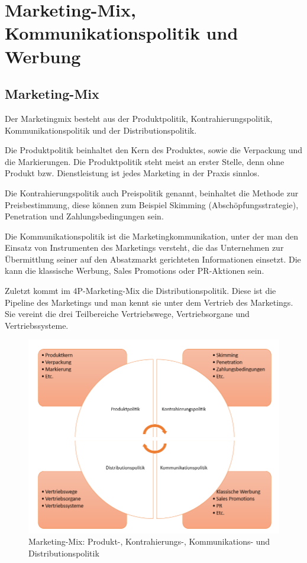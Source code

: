 \chapter{Marketing-Mix, Kommunikationspolitik und Werbung}
\section{Marketing-Mix}
Der Marketingmix besteht aus der Produktpolitik, Kontrahierungspolitik, Kommunikationspolitik und der Distributionspolitik.

Die Produktpolitik beinhaltet den Kern des Produktes, sowie die Verpackung und die Markierungen. Die Produktpolitik steht meist an erster Stelle, denn ohne Produkt bzw. Dienstleistung  ist  jedes  Marketing  in  der  Praxis  sinnlos. 

Die Kontrahierungspolitik auch Preispolitik genannt, beinhaltet die Methode zur Preisbestimmung, diese können zum Beispiel Skimming (Abschöpfungsstrategie), Penetration und Zahlungsbedingungen sein.

Die Kommunikationspolitik ist die Marketingkommunikation, unter der man den Einsatz von Instrumenten des Marketings versteht, die das Unternehmen zur Übermittlung seiner auf den Absatzmarkt gerichteten Informationen einsetzt. Die kann die klassische Werbung, Sales Promotions oder PR-Aktionen sein.

Zuletzt kommt im 4P-Marketing-Mix die Distributionspolitik. Diese ist die Pipeline des Marketings und man kennt sie  unter dem Vertrieb des Marketings. Sie vereint die drei Teilbereiche Vertriebswege, Vertriebsorgane und Vertriebssysteme.
\begin{figure}[H]
	\centering
	\includegraphics[width=1.0\linewidth]{img/MarketingMix}
	\caption[Marketing-Mix]{Marketing-Mix: Produkt-, Kontrahierungs-, Kommunikations- und Distributionspolitik}
	\label{fig:marketingmix}
\end{figure}


